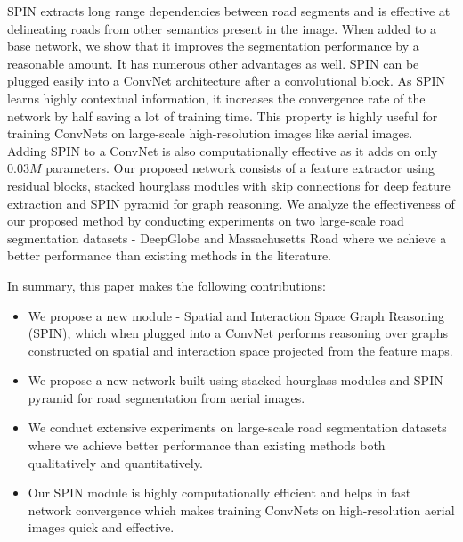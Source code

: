 \documentclass[letterpaper, 10 pt, conference]{ieeeconf}
\begin{document}
SPIN extracts long range dependencies between road segments and is effective at delineating roads from other semantics present in the image. When added to a base network, we show that it improves the segmentation performance by a reasonable amount.  It has numerous other advantages as well. SPIN can be plugged easily into a ConvNet architecture after a convolutional block. As SPIN learns highly contextual information, it increases the convergence rate of the network by half saving a lot of training time. This property is highly useful for training ConvNets on large-scale high-resolution images like aerial images. Adding SPIN to a ConvNet is also computationally effective as it adds on only $0.03 M$ parameters. Our proposed network consists of a feature extractor using residual blocks, stacked hourglass modules with skip connections for deep feature extraction and SPIN pyramid for graph reasoning. We analyze the effectiveness of our proposed method by conducting experiments on two large-scale road segmentation datasets - DeepGlobe \cite{demir2018deepglobe} and Massachusetts Road \cite{mnih2013machine} where we achieve a better performance than existing methods in the literature.

In summary, this paper makes the following contributions:
\begin{itemize}{}
	\item We propose a new module - Spatial and Interaction Space Graph Reasoning (SPIN), which when plugged into a ConvNet performs reasoning over graphs constructed on spatial and interaction space projected from the feature maps.
	\item We propose a new network built using stacked hourglass modules and SPIN pyramid for road segmentation from aerial images.
	\item We conduct extensive experiments on large-scale road segmentation datasets where we achieve better performance than existing methods both qualitatively and quantitatively.
	\item Our SPIN module is highly computationally efficient and helps in fast network convergence which makes training ConvNets on high-resolution aerial images quick and effective. 
\end{itemize}
\end{document}
